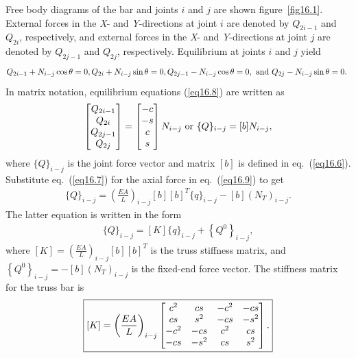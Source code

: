 \documentclass{AeroStructure-ERJohnson}
\begin{document}
Free body diagrams of the bar and joints $i$ and $j$ are shown figure~\ref{fig16.1}. External forces in the \textit{X}- and \textit{Y}-directions at joint $i$ are denoted by $Q_{2 i-1}$ and $Q_{2 i}$, respectively, and external forces in the \textit{X}- and \textit{Y}-directions at joint $j$ are denoted by $Q_{2 j-1}$ and $Q_{2 j}$, respectively. Equilibrium at joints $i$ and $j$ yield
\begin{align}\label{eq16.8}
Q_{2 i-1}+N_{i-j} \cos \theta=0, Q_{2 i}+N_{i-j} \sin \theta=0, Q_{2 j-1}-N_{i-j} \cos \theta=0,\mbox{ and }Q_{2 j}-N_{i-j} \sin \theta=0.\hspace*{4pt}
\end{align}
In matrix notation, equilibrium equations (\ref{eq16.8}) are written as
\begin{align}\label{eq16.9}
\left[\begin{array}{@{}c@{}}Q_{2 i-1} \\Q_{2 i} \\Q_{2 j-1} \\Q_{2 j}\end{array}\right]=\left[\begin{array}{@{}c@{}}-c \\-s \\c \\s\end{array}\right] N_{i-j}\mbox{ or }\{Q\}_{i-j}=[b] N_{i-j},
\end{align}
where $\{Q\}_{i-j}$ is the joint force vector and matrix $[b]$ is defined in eq.~(\ref{eq16.6}). Substitute eq.~(\ref{eq16.7}) for the axial force in eq.~(\ref{eq16.9}) to get
\begin{align}\label{eq16.10}
\{Q\}_{i-j}=\left(\frac{E A}{L}\right)_{i-j}[b][b]^{T}\{q\}_{i-j}-[b]\left(N_{T}\right)_{i-j}.
\end{align}
The latter equation is written in the form
\begin{align}\label{eq16.11}
\{Q\}_{i-j}=[K]\{q\}_{i-j}+\left\{Q^{0}\right\}_{i-j},
\end{align}
where $[K]=\left(\frac{E A}{L}\right)_{i-j}[b][b]^{T}$ is the truss stiffness matrix, and $\left\{Q^{0}\right\}_{i-j}=-[b]\left(N_{T}\right)_{i-j}$ is the fixed-end force vector. The stiffness matrix for the truss bar is\pagebreak
\begin{align}\label{eq16.12}
\fbox{$\displaystyle[K]=\left(\frac{E A}{L}\right)_{i-j}\left[\begin{array}{@{}cccc@{}}c^{2} & c s & -c^{2} & -c s \\c s & s^{2} & -c s & -s^{2} \\-c^{2} & -c s & c^{2} & c s \\-c s & -s^{2} & c s & s^{2}\end{array}\right].$}
\end{align}
\end{document}
